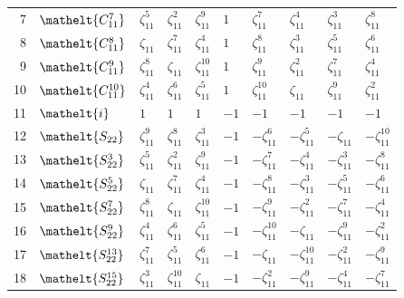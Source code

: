 \documentclass[10pt,a4paper]{article}
\numberwithin{equation}{section}
\newcommand{\eltfont}[1]{{\let\sigma\eltsigma\mathelt{#1}}}
\newcommand{\cls}[1]{\eltfont{#1}}
\newcommand{\rootunity}[1]{\zeta_{#1}}
\begin{document}
{\begin{longtable}{@{}rlllllllll@{}}
7 & $\cls{C_{11}^{7}}$ & $\rootunity{11}^{5}$ & $\rootunity{11}^{2}$ & $\rootunity{11}^{9}$ & $1$ & $\rootunity{11}^{7}$ & $\rootunity{11}^{4}$ & $\rootunity{11}^{3}$ & $\rootunity{11}^{8}$\\
8 & $\cls{C_{11}^{8}}$ & $\rootunity{11}$ & $\rootunity{11}^{7}$ & $\rootunity{11}^{4}$ & $1$ & $\rootunity{11}^{8}$ & $\rootunity{11}^{3}$ & $\rootunity{11}^{5}$ & $\rootunity{11}^{6}$\\
9 & $\cls{C_{11}^{9}}$ & $\rootunity{11}^{8}$ & $\rootunity{11}$ & $\rootunity{11}^{10}$ & $1$ & $\rootunity{11}^{9}$ & $\rootunity{11}^{2}$ & $\rootunity{11}^{7}$ & $\rootunity{11}^{4}$\\
10 & $\cls{C_{11}^{10}}$ & $\rootunity{11}^{4}$ & $\rootunity{11}^{6}$ & $\rootunity{11}^{5}$ & $1$ & $\rootunity{11}^{10}$ & $\rootunity{11}$ & $\rootunity{11}^{9}$ & $\rootunity{11}^{2}$\\
11 & $\cls{i}$ & $1$ & $1$ & $1$ & $-1$ & $-1$ & $-1$ & $-1$ & $-1$\\
12 & $\cls{S_{22}}$ & $\rootunity{11}^{9}$ & $\rootunity{11}^{8}$ & $\rootunity{11}^{3}$ & $-1$ & $-\rootunity{11}^{6}$ & $-\rootunity{11}^{5}$ & $-\rootunity{11}$ & $-\rootunity{11}^{10}$\\
13 & $\cls{S_{22}^{3}}$ & $\rootunity{11}^{5}$ & $\rootunity{11}^{2}$ & $\rootunity{11}^{9}$ & $-1$ & $-\rootunity{11}^{7}$ & $-\rootunity{11}^{4}$ & $-\rootunity{11}^{3}$ & $-\rootunity{11}^{8}$\\
14 & $\cls{S_{22}^{5}}$ & $\rootunity{11}$ & $\rootunity{11}^{7}$ & $\rootunity{11}^{4}$ & $-1$ & $-\rootunity{11}^{8}$ & $-\rootunity{11}^{3}$ & $-\rootunity{11}^{5}$ & $-\rootunity{11}^{6}$\\
15 & $\cls{S_{22}^{7}}$ & $\rootunity{11}^{8}$ & $\rootunity{11}$ & $\rootunity{11}^{10}$ & $-1$ & $-\rootunity{11}^{9}$ & $-\rootunity{11}^{2}$ & $-\rootunity{11}^{7}$ & $-\rootunity{11}^{4}$\\
16 & $\cls{S_{22}^{9}}$ & $\rootunity{11}^{4}$ & $\rootunity{11}^{6}$ & $\rootunity{11}^{5}$ & $-1$ & $-\rootunity{11}^{10}$ & $-\rootunity{11}$ & $-\rootunity{11}^{9}$ & $-\rootunity{11}^{2}$\\
17 & $\cls{S_{22}^{13}}$ & $\rootunity{11}^{7}$ & $\rootunity{11}^{5}$ & $\rootunity{11}^{6}$ & $-1$ & $-\rootunity{11}$ & $-\rootunity{11}^{10}$ & $-\rootunity{11}^{2}$ & $-\rootunity{11}^{9}$\\
18 & $\cls{S_{22}^{15}}$ & $\rootunity{11}^{3}$ & $\rootunity{11}^{10}$ & $\rootunity{11}$ & $-1$ & $-\rootunity{11}^{2}$ & $-\rootunity{11}^{9}$ & $-\rootunity{11}^{4}$ & $-\rootunity{11}^{7}$\\

\end{longtable}}
\end{document}
